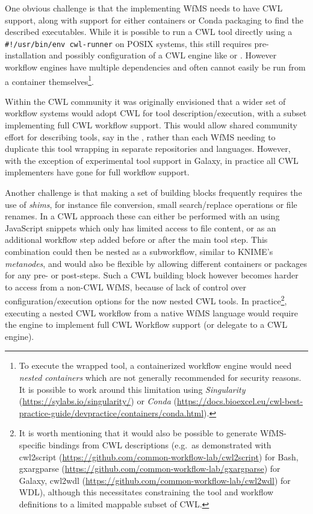 One obvious challenge is that the implementing WfMS needs to have CWL support, along with support for either containers or Conda packaging to find the described executables.
While it is possible to run a CWL tool directly using a \texttt{\#!/usr/bin/env\ cwl-runner}  on POSIX systems, this still requires pre-installation and possibly configuration of a CWL engine like  or  \cite{Vivian 2017}.
However workflow engines have multiple dependencies and often cannot easily be run from a container themselves\footnote{To execute the wrapped tool, a containerized workflow engine would need \emph{nested containers} which are not generally recommended for security reasons.
It is possible to work around this limitation using \emph{Singularity} (\url{https://sylabs.io/singularity/}) or \emph{Conda} (\url{https://docs.bioexcel.eu/cwl-best-practice-guide/devpractice/containers/conda.html}).}.

Within the CWL community it was originally envisioned that a wider set of workflow systems would adopt CWL for tool description/execution, with a subset implementing full CWL workflow support.
This would allow shared community effort for describing tools, say in the , rather than each WfMS needing to duplicate this tool wrapping in separate repositories and languages.
However, with the exception of experimental tool support in Galaxy, in practice all CWL implementers have gone for full workflow support.

Another challenge is that making a set of building blocks frequently requires the use of \emph{shims}, for instance file conversion, small search/replace operations or file renames.
In a CWL approach these can either be performed with an  using JavaScript snippets which only has limited access to file content, or as an additional workflow step added before or after the main tool step.
This combination could then be nested as a subworkflow, similar to KNIME's \emph{metanodes}, and would also be flexible by allowing different containers or packages for any pre- or post-steps.
Such a CWL building block however becomes harder to access from a non-CWL WfMS, because of lack of control over configuration/execution options for the
now nested CWL tools.
In practice\footnote{It is worth mentioning that it would also be possible to generate WfMS-specific bindings from CWL descriptions 
(e.g.~as demonstrated with 
cwl2script (\url{https://github.com/common-workflow-lab/cwl2script}) for Bash, 
gxargparse (\url{https://github.com/common-workflow-lab/gxargparse}) for Galaxy, 
cwl2wdl (\url{https://github.com/common-workflow-lab/cwl2wdl}) for WDL), 
although this necessitates constraining the tool and workflow definitions to a limited mappable subset of CWL.}, executing a nested CWL workflow from a native WfMS language would require the engine to implement full CWL Workflow support (or delegate to a CWL engine).

